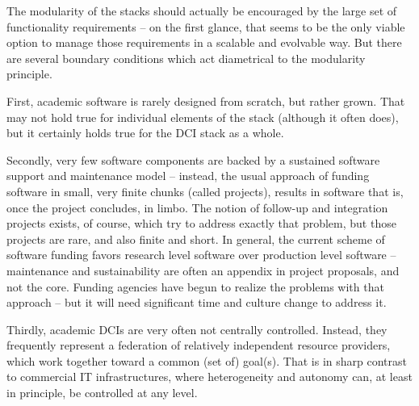 \documentclass[a4paper,12pt]{article}
\begin{document}
  The modularity of the stacks should actually be encouraged by the
  large set of functionality requirements -- on the first glance, that
  seems to be the only viable option to manage those requirements in a
  scalable and evolvable way.  But there are several boundary
  conditions which act diametrical to the modularity principle.

  First, academic software is rarely designed from scratch, but rather
  grown.  That may not hold true for individual elements of the stack
  (although it often does), but it certainly holds true for the DCI
  stack as a whole.

  Secondly, very few software components are backed by a sustained
  software support and maintenance model -- instead, the usual
  approach of funding software in small, very finite chunks (called
  projects), results in software that is, once the project concludes,
  in limbo.  The notion of follow-up and integration projects exists,
  of course, which try to address exactly that problem, but those
  projects are rare, and also finite and short.  In general, the
  current scheme of software funding favors research level software
  over production level software -- maintenance and sustainability are
  often an appendix in project proposals, and not the core.  Funding
  agencies have begun to realize the problems with that approach --
  but it will need significant time and culture change to address it.

  Thirdly, academic DCIs are very often not centrally controlled.
  Instead, they frequently represent a federation of relatively
  independent resource providers, which work together toward a common
  (set of) goal(s).  That is in sharp contrast to commercial IT
  infrastructures, where heterogeneity and autonomy can, at least
  in principle, be controlled at any level.

\end{document}
